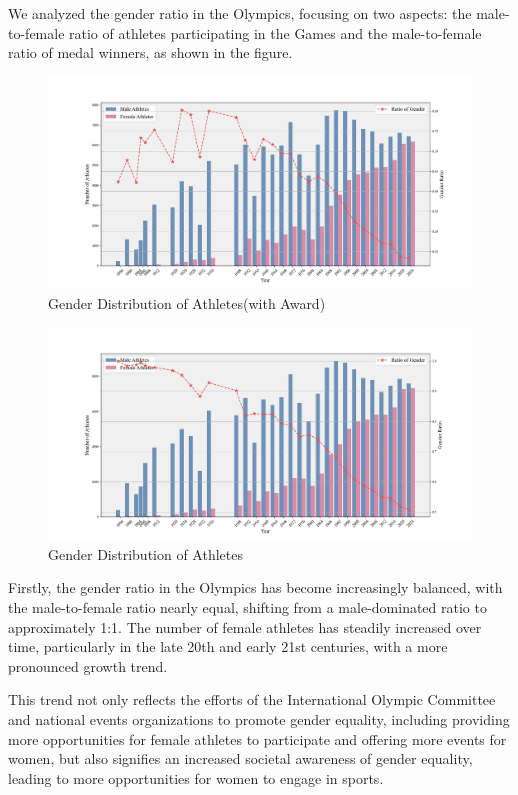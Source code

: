 \documentclass[12pt]{article}  %
\begin{document}
We analyzed the gender ratio in the Olympics, focusing on two aspects: the male-to-female ratio of athletes participating in the Games and the male-to-female ratio of medal winners, as shown in the figure.

	\begin{figure}[htbp]
		\centering
		\includegraphics[width=12cm]{img/Gender with Award.png}
		\caption{Gender Distribution of Athletes(with Award)}
		\label{fig:aa}
	\end{figure}
	
	\begin{figure}[htbp]
		\centering
		\includegraphics[width=12cm]{img/Gender.png}
		\caption{Gender Distribution of Athletes}
		\label{fig:aa}
	\end{figure}
	
Firstly, the gender ratio in the Olympics has become increasingly balanced, with the male-to-female ratio nearly equal, shifting from a male-dominated ratio to approximately 1:1. The number of female athletes has steadily increased over time, particularly in the late 20th and early 21st centuries, with a more pronounced growth trend.

This trend not only reflects the efforts of the International Olympic Committee and national events organizations to promote gender equality, including providing more opportunities for female athletes to participate and offering more events for women, but also signifies an increased societal awareness of gender equality, leading to more opportunities for women to engage in sports.
\end{document}
